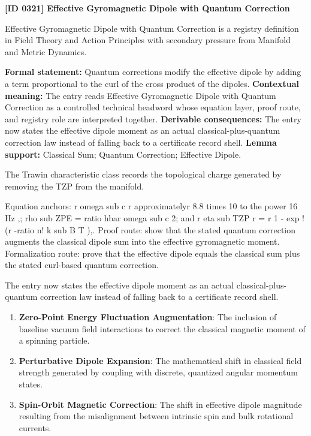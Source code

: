 \clearpage
\noindent\textbf{[ID 0321] Effective Gyromagnetic Dipole with Quantum Correction}\par
\vspace{0.35em}
\begingroup\small
{}
Effective Gyromagnetic Dipole with Quantum Correction is a registry definition in Field Theory and Action Principles with secondary pressure from Manifold and Metric Dynamics.

\begingroup\footnotesize\setlength{\emergencystretch}{3em}\sloppy
\textbf{Formal statement:} Quantum corrections modify the effective dipole by adding a term proportional to the curl of the cross product of the dipoles. \textbf{Contextual meaning:} The entry reads Effective Gyromagnetic Dipole with Quantum Correction as a controlled technical headword whose equation layer, proof route, and registry role are interpreted together. \textbf{Derivable consequences:} The entry now states the effective dipole moment as an actual classical-plus-quantum correction law instead of falling back to a certificate record shell. \textbf{Lemma support:} Classical Sum; Quantum Correction; Effective Dipole.\par
\endgroup

The Trawin characteristic class records the topological charge generated by removing the TZP from the manifold.

Equation anchors: r omega sub c r approximatelyr 8.8 times 10 to the power 16 Hz ,; rho sub ZPE = ratio hbar omega sub c 2; and r eta sub TZP r = r 1 - exp !(r -ratio n! k sub B T ),. Proof route: show that the stated quantum correction augments the classical dipole sum into the effective gyromagnetic moment. Formalization route: prove that the effective dipole equals the classical sum plus the stated curl-based quantum correction.

The entry now states the effective dipole moment as an actual classical-plus-quantum correction law instead of falling back to a certificate record shell.
\endgroup

\begin{enumerate}[leftmargin=1.6em,itemsep=6pt,topsep=4pt]
\item \textbf{Zero-Point Energy Fluctuation Augmentation}: The inclusion of baseline vacuum field interactions to correct the classical magnetic moment of a spinning particle.
\item \textbf{Perturbative Dipole Expansion}: The mathematical shift in classical field strength generated by coupling with discrete, quantized angular momentum states.
\item \textbf{Spin-Orbit Magnetic Correction}: The shift in effective dipole magnitude resulting from the misalignment between intrinsic spin and bulk rotational currents.
\end{enumerate}

